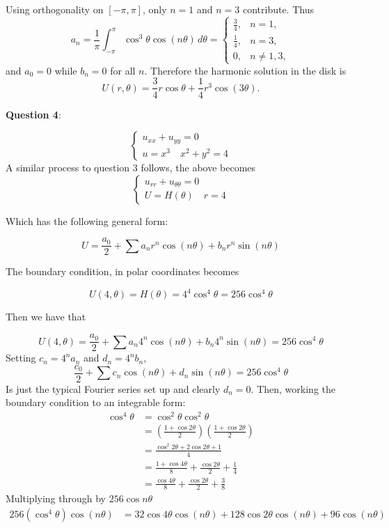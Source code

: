\documentclass{article} %
\newcommand{\question}[2][]{
  \begin{flushleft}
    \textbf{Question #1}: \textit{#2}

\end{flushleft}}
\begin{document}
Using orthogonality on $[-\pi,\pi]$, only $n=1$ and $n=3$ contribute.
Thus
\[
  a_n = \frac{1}{\pi}\int_{-\pi}^{\pi}\cos^3\theta\cos(n\theta)\,d\theta
  =
  \begin{cases}
    \frac{3}{4}, & n = 1,\\
    \frac{1}{4}, & n = 3,\\
    0, & n \ne 1,3,
  \end{cases}
\]
and $a_0 = 0$ while $b_n = 0$ for all $n$. Therefore the harmonic
solution in the disk is
\[
  U(r,\theta) = \frac{3}{4}r\cos\theta + \frac{1}{4}r^3\cos(3\theta).
\]
\question[4]{}

\[
  \begin{cases}
    u_{xx} + u_{yy} = 0 \\
    u = x^3 \quad x^2 + y^2 = 4
  \end{cases}
\]
A similar process to question $3$ follows, the above becomes
$$
\begin{cases}
  u_{rr} + u_{\theta\theta} = 0 \\
  U = H(\theta) \quad r = 4
\end{cases}
$$

Which has the following general form:

\[
  U = \frac{a_0}{2} + \sum a_n r^n \cos(n\theta) + b_n r^n\sin(n\theta)
\]

The boundary condition, in polar coordinates becomes

\[
  U(4, \theta) = H(\theta) = 4^4\cos^4\theta = 256 \cos^4\theta
\]

Then we have that

\[
  U(4, \theta) = \frac{a_0}{2} + \sum a_n 4^n \cos(n\theta) + b_n
  4^n\sin(n\theta) = 256\cos^4\theta
\]
Setting $c_n = 4^na_n$ and $d_n = 4^nb_n$,
\[
  \frac{c_0}{2} + \sum c_n\cos(n\theta) + d_n\sin(n\theta)
  = 256\cos^4\theta
\]
Is just the typical Fourier series set up and clearly $d_n = 0$. Then,
working the boundary
condition to an integrable form:
\[
  \begin{aligned}
    \cos^4\theta
    &= \cos^2\theta\cos^2\theta \\
    &= \left(\frac{1+\cos 2\theta}{2}\right)\left(\frac{1+\cos
    2\theta}{2}\right) \\
    &= \frac{\cos^2 2\theta + 2\cos 2\theta + 1}{4} \\
    &= \frac{1+\cos 4\theta}{8} + \frac{\cos 2\theta}{2} + \frac{1}{4} \\
    &= \frac{\cos 4\theta}{8} + \frac{\cos 2\theta}{2} + \frac{3}{8}
  \end{aligned}
\]
Multiplying through by $256\cos n\theta$
\[
  \begin{aligned}
    256(\cos^4\theta)\cos(n\theta)
    &= 32\cos 4\theta\cos(n\theta)
    + 128\cos 2\theta\cos(n\theta)
    + 96\cos(n\theta) \\
  \end{aligned}
\]
\end{document}
